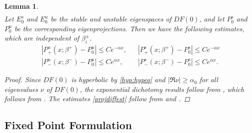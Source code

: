 \documentclass[10pt,reqno]{amsart}
\theoremstyle{plain}
\newtheorem{lemma}[theorem]{Lemma}
\theoremstyle{definition}
\theoremstyle{remark}
\numberwithin{theorem}{section}
\numberwithin{equation}{section}
\begin{document}
\begin{lemma}
\begin{align*}
\end{align*}
Let $E_0^s$ and $E_0^u$ be the stable and unstable eigenspaces of $DF(0)$, and let $P_0^s$ and $P_0^u$ be the corresponding eigenprojections. Then we have the following estimates, which are independent of $\beta_i^\pm$.
\begin{equation}\label{projdiffest}
\begin{aligned}
&|P^u_+(x; \beta^+) - P_0^u| \leq C e^{-\alpha x},
&&|P^s_+(x; \beta^+) - P_0^s| \leq C e^{-\alpha x} \\
&|P^u_-(x; \beta^-) - P_0^u| \leq C e^{\alpha x},
&&|P^s_-(x; \beta^-) - P_0^s| \leq C e^{\alpha x} .
\end{aligned}
\end{equation}

\begin{proof}
Since $DF(0)$ is hyperbolic by \cref{hyp:hypeq} and $|\Re \nu| \geq \alpha_0$ for all eigenvalues $\nu$ of $DF(0)$, the exponential dichotomy results follow from \cite[Lemma 5.1]{Sandstede1997}, which follows from \cite[Lemma 1.1]{Sandstede1993}. The estimates \cref{projdiffest} follow from \cite[Lemma 1.1]{Sandstede1993} and \cite[Lemma 2.1]{Sandstede1993}.
\end{proof}
\end{lemma}

\subsection{Fixed Point Formulation}
\end{document}
